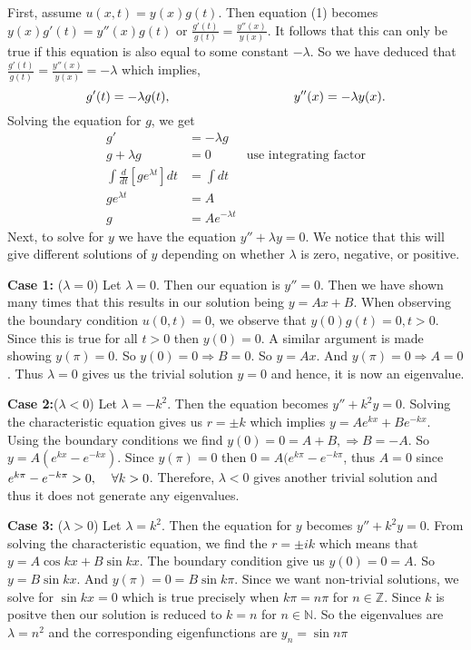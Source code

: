 \documentclass{article}
\begin{document}
First, assume \(u(x,t)= y(x)g(t)\). Then equation (1) becomes \(y(x)g'(t) = y''(x)g(t)\) or \(\frac{g'(t)}{g(t)} = \frac{y''(x)}{y(x)}\). It follows that this can only be true if this equation is also equal to some constant \(-\lambda\). So we have deduced that \(\frac{g'(t)}{g(t)} = \frac{y''(x)}{y(x)}=-\lambda \) which implies, 
\[
g'(t) = -\lambda g(t), \hspace{34mm}  y''(x) = -\lambda y(x).
\]
Solving the equation for \(g\), we get
\begin{align*}
g' &= -\lambda g \\
g +\lambda g &= 0   &   \text{use integrating factor}\\
\int \frac{d}{dt}[ ge^{\lambda t}] dt&= \int dt \\
ge^{\lambda t} &= A\\
g&= Ae^{-\lambda t} 
\end{align*}
Next, to solve for \(y\) we have the equation \(y'' + \lambda y = 0\). We notice that this will give different solutions of \(y\) depending on whether \(\lambda \) is zero, negative, or positive. 


\vspace{4mm}
\textbf{Case 1:} (\(\lambda = 0\)) Let \(\lambda=0\). Then our equation is \(y''= 0\). Then we have shown many times that this results in our solution being \(y=Ax+B\). When observing the boundary condition \(u(0,t)=0\), we observe that \( y(0)g(t)=0, t>0\). Since this is true for all \(t>0\) then \(y(0)=0\). 
A similar argument is made showing \(y(\pi)=0\). So \(y(0)=0 \Rightarrow B=0\). So \(y=Ax\). And \(y(\pi)=0 \Rightarrow A=0\). Thus \(\lambda=0\) gives us the trivial solution \(y=0\) and hence, it is now an eigenvalue. 


\vspace{4mm}
\textbf{Case 2:}(\(\lambda <0\)) Let \(\lambda = -k^2\). Then the equation becomes \(y''+k^2y=0\). Solving the characteristic equation gives us \(r=\pm k\) which implies \(y=Ae^{kx}+Be^{-kx}\). Using the boundary conditions we find \(y(0)=0=A+B, \Rightarrow B=-A\).  So \(y= A(e^{kx}-e^{-kx})\). Since \(y(\pi)=0 \) then \(0 = A(e^{k\pi}-e^{-k\pi} \), thus \(A=0\) since \( e^{k\pi}-e^{-k\pi}>0, \hspace{4mm}  \forall k>0\). Therefore, \(\lambda <0\) gives another trivial solution and thus it does not generate any eigenvalues. 


\newpage
\textbf{Case 3:} (\( \lambda >0\)) Let \(\lambda = k^2\). Then the equation for \(y\) becomes \(y''+k^2y=0\). From solving the characteristic equation, we find the \(r=\pm ik\) which means that \( y= A\cos kx + B\sin kx\). The boundary condition give us \(y(0)=0=A\). So \(y=B\sin kx\). And \(y(\pi)=0=B\sin k\pi\). Since we want non-trivial solutions, we solve for \(\sin kx=0\) which is true precisely when \(k\pi= n\pi \) for \( n \in \mathbb{Z}\). Since \(k\) is positve then our solution is reduced to \(k= n \) for \( n \in \mathbb{N}\). So the eigenvalues are \(\lambda = n^2\) and the corresponding eigenfunctions are \(y_n= \sin n \pi \) 
\end{document}
